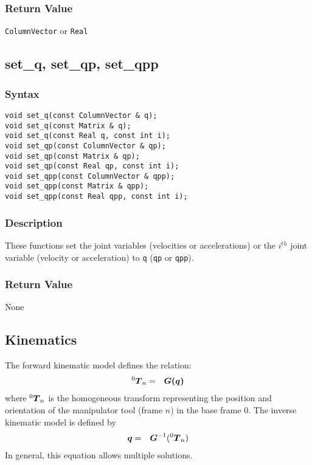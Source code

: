 \documentclass[dvips,11pt,fleqn]{report}
\newcommand{\mbold}[1]{\mbox{\boldmath $ #1 $}}
\begin{document}
\subsubsection*{Return Value}

{\tt ColumnVector} or {\tt Real}

\newpage

\subsection*{set\_q, set\_qp, set\_qpp}
\subsubsection*{Syntax}
\begin{verbatim}
void set_q(const ColumnVector & q);
void set_q(const Matrix & q);
void set_q(const Real q, const int i);
void set_qp(const ColumnVector & qp);
void set_qp(const Matrix & qp);
void set_qp(const Real qp, const int i);
void set_qpp(const ColumnVector & qpp);
void set_qpp(const Matrix & qpp);
void set_qpp(const Real qpp, const int i);
\end{verbatim}
\subsubsection*{Description}
These functions set the joint variables (velocities or accelerations)
or the $i^{th}$ joint variable (velocity or acceleration) to {\tt q}
(\texttt{qp} or \texttt{qpp}).

\subsubsection*{Return Value}

None

\newpage

\subsection{Kinematics}

The forward kinematic model defines the relation:
\begin{eqnarray}
{}^0 \mbold{T}_n & = & \mbold{G(q)}
\end{eqnarray}
where ${}^0 \mbold{T}_n$ is the homogeneous transform representing the position
and orientation of the manipulator tool (frame $n$) in the base frame $0$.
The inverse kinematic model is defined by
\begin{eqnarray}
\mbold{q} & = & \mbold{G}^{-1}({}^0 \mbold{T}_n)
\end{eqnarray}
In general, this equation allows multiple solutions.
\end{document}
